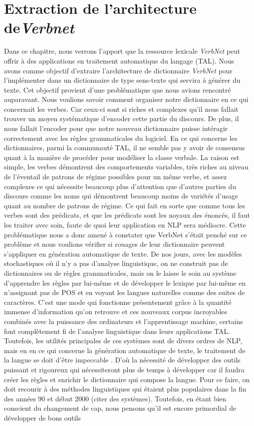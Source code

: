 \chapter{Extraction de l'architecture de\emph{Verbnet}}

Dans ce chapitre, nous verrons l'apport que la ressource lexicale \emph{VerbNet} peut offrir à des applications en traitement automatique du langage (TAL). Nous avons comme objectif d'extraire l'architecture de dictionnaire \emph{VerbNet} pour l'implémenter dans un dictionnaire de type sens-texte qui servira à générer du texte. Cet objectif provient d'une problématique que nous avions rencontré auparavant. Nous voulions savoir comment organiser notre dictionnaire en ce qui concernait les verbes. Car ceux-ci sont si riches et complexes qu'il nous fallait trouver un moyen systématique d'encoder cette partie du discours. De plus, il nous fallait l'encoder pour que notre nouveau dictionnaire puisse intéragir correctement avec les règles grammaticales du logiciel. En ce qui concerne les dictionnaires, parmi la communauté TAL,  il ne semble pas y avoir de consensus quant à la manière de procéder pour modéliser la classe verbale. La raison est simple,  les verbes démontrent des comportements variables, très riches au niveau de l'éventail de patrons de régime possibles pour un même verbe, et assez complexes ce qui nécessite beaucoup plus d'attention que d'autres parties du discours comme les noms qui démontrent beaucoup moins de variétés d'usage quant au nombre de patrons de régime. Ce qui fait en sorte que comme tous les verbes sont des prédicats, et que les prédicats sont les noyaux des énoncés, il faut les traiter avec soin, faute de quoi leur application en NLP sera médiocre. Cette problématique nous a donc amené à constater que VerbNet s'était penché sur ce problème et nous voulions vérifier si rouages de leur dictionnaire peuvent s'appliquer en génération automatique de texte. De nos jours, avec les modèles stochastiques où il n'y a pas d'analyse linguistique, on ne construit pas de dictionnaires ou de règles grammaticales, mais on le laisse le soin au système d'apprendre les règles par lui-même et de développer le lexique par lui-même en n'assignant pas de POS et en voyant les langues naturelles comme des suites de caractères. C'est une mode qui fonctionne présentement grâce à la quantité immense d'information qu'on retrouve et ces nouveaux corpus incroyables combinés avec la puissance des ordinateurs et l'apprentissage machine, certains font complètement fi de l'analyse linguistique dans leurs applications TAL. Toutefois, les utilités principales de ces systèmes sont de divers ordres de NLP, mais en en ce qui concerne la génération automatique de texte, le traitement de la langue se doit d'être impeccable \citep{lareau18}. D'où la nécessité de développer des outils puissant et rigoureux qui nécessiteront plus de temps à développer car il faudra créer les règles et enrichir le dictionnaire qui compose la langue. Pour ce faire, on doit recourir à des méthodes linguistiques qui étaient plus populaires dans la fin des années 90 et début 2000 (citer des systèmes). Toutefois, en étant bien conscient du changement de cap, nous pensons qu'il est encore primordial de développer de bons outils 